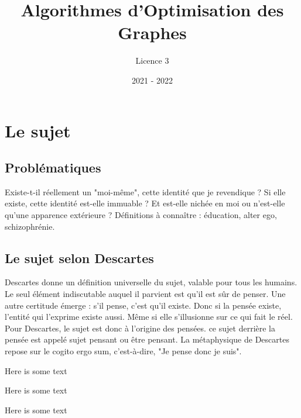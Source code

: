 \documentclass{article}%
\title{Algorithmes d'Optimisation des Graphes}%
\author{Licence 3}%
\date{2021 {-} 2022}%
\begin{document}
%
\normalsize%
\maketitle%
\tableofcontents%
\newpage%
\section{Le sujet}%
\label{sec:Lesujet}%

%
\subsection{Problématiques}%
\label{subsec:Problmatiques}%
Existe{-}t{-}il réellement un "moi{-}même", cette identité que je revendique ?%
\newline%
\newline%
Si elle existe, cette identité est{-}elle immuable ?%
\newline%
\newline%
Et est{-}elle nichée en moi ou n'est{-}elle qu'une apparence extérieure ?%
\newline%
\newline%
Définitions à connaître : éducation, alter ego, schizophrénie.

%
\subsection{Le sujet selon Descartes}%
\label{subsec:LesujetselonDescartes}%
Descartes donne un définition universelle du sujet, valable pour tous les humains. Le seul élément indiscutable auquel il parvient est qu'il est sûr de penser. Une autre certitude émerge : s'il pense, c'est qu'il existe. Donc si la pensée existe, l'entité qui l'exprime existe aussi. Même si elle s'illusionne sur ce qui fait le réel. Pour Descartes, le sujet est donc à l'origine des pensées. ce sujet derrière la pensée est appelé sujet pensant ou être pensant. La métaphysique de Descartes repose sur le cogito ergo sum, c'est{-}à{-}dire, "Je pense donc je suis".

\begin{tcolorbox}[colframe=danger, colback=danger-bg]
Here is some text
\end{tcolorbox}

\begin{tcolorbox}[width=5cm]
Here is some text
\end{tcolorbox}

\begin{tcolorbox}[width=.5\textwidth, colframe=red]
Here is some text
\end{tcolorbox}
\end{document}
